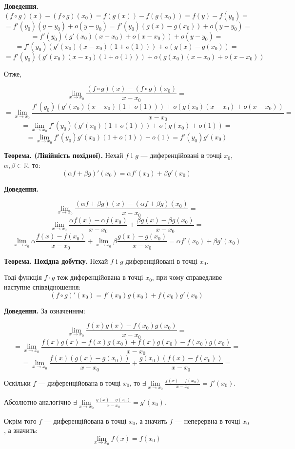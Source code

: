 \documentclass[12pt]{report}
\begin{document}
\textbf{Доведення.} 
$$(f \circ g) (x) - (f \circ g) (x_0) = f(g(x)) - f(g(x_0)) = f(y) - f(y_0) =$$ 
$$= f'(y_0)(y - y_0) + o(y - y_0) = f'(y_0)(g(x) - g(x_0)) + o(y - y_0) = $$
$$= f'(y_0)(g'(x_0)(x - x_0) + o(x - x_0)) + o(y - y_0) = $$
$$= f'(y_0)(g'(x_0)(x - x_0)(1 + o(1))) + o(g(x) - g(x_0)) = $$
$$= f'(y_0)(g'(x_0)(x - x_0)(1 + o(1))) + o(g(x_0)(x - x_0) + o(x - x_0))$$

Отже,

$$\lim_{x \to x_0} \frac{(f \circ g)(x) - (f \circ g)(x_0)}{x - x_0} = $$
$$=\lim_{x \to x_0}\frac{f'(y_0)(g'(x_0)(x - x_0)(1 + o(1))) + o(g(x_0)(x - x_0) + o(x - x_0))}{x - x_0} = $$
$$=\lim_{x \to x_0}f'(y_0)(g'(x_0)(1 + o(1))) + o(g(x_0) + o(1)) = $$
$$=\lim_{x \to x_0}f'(y_0)g'(x_0)(1 + o(1)) + o(1) = f'(y_0)g'(x_0)$$

\textbf{Теорема. (Лінійність похідної).} Нехай $f$ і $g$ --- диференційовані в точці $x_0$, $\alpha,\beta \in \mathbb{R}$, то:
$$(\alpha f + \beta g)' (x_0) = \alpha f'(x_0) + \beta g'(x_0)$$

\textbf{Доведення.} 

$$\lim_{x \to x_0} \frac{(\alpha f + \beta g)(x) - (\alpha f + \beta g)(x_0)}{x - x_0} = $$
$$\lim_{x \to x_0} \frac{ \alpha f(x) - \alpha f(x_0)}{x - x_0} + \frac{\beta g(x) - \beta g (x_0)}{x - x_0} = $$
$$\lim_{x \to x_0} \alpha \frac{ f(x) - f(x_0)}{x - x_0} + \lim_{x \to x_0}\beta \frac{g(x) - g (x_0)}{x - x_0}  = \alpha f'(x_0) + \beta g'(x_0)$$

\textbf{Теорема. Похідна добутку.} Нехай $f$ і $g$ диференційовані в точці $x_0$. 

Тоді функція $f \cdot g$ теж диференційована в точці $x_0$, при чому справедливе наступне співвідношення:
$$(f \circ g)' (x_0) = f'(x_0)g(x_0) + f(x_0) g'(x_0)$$

\textbf{Доведення.} За означенням:

$$\lim_{x \to x_0} \frac{f(x)g(x) - f(x_0)g(x_0)}{x - x_0} = $$
$$= \lim_{x \to x_0} \frac{f(x)g(x) - f(x)g(x_0) + f(x)g(x_0) - f(x_0)g(x_0)}{x - x_0} = $$
$$= \lim_{x \to x_0} \frac{f(x)(g(x) - g(x_0))}{x - x_0} + \frac{g(x_0)(f(x) - f(x_0))}{x - x_0} = $$

Оскільки $f$ --- диференційована в точці $x_0$, то $\exists \lim\limits_{x \to x_0} \frac{f(x) - f(x_0)}{x - x_0} = f'(x_0)$.

Абсолютно аналогічно $\exists \lim\limits_{x \to x_0} \frac{g(x) - g(x_0)}{x - x_0} = g'(x_0)$.

Окрім того $f$ --- диференційована в точці $x_0$, а значить $f$ --- неперервна в точці $x_0$, а значить:
$$\lim_{x \to x_0} f(x) = f(x_0)$$
\end{document}

